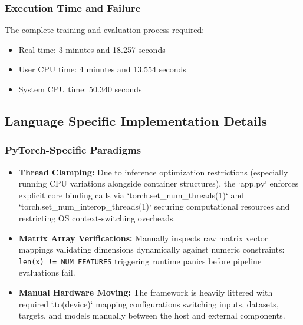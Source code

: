 \documentclass{ieeeaccess}
\begin{document}
\subsubsection{Execution Time and Failure}

The complete training and evaluation process required:

\begin{itemize}
    \item Real time: 3 minutes and 18.257 seconds
    \item User CPU time: 4 minutes and 13.554 seconds
    \item System CPU time: 50.340 seconds
\end{itemize}

\subsection{Language Specific Implementation Details}

\subsubsection{PyTorch-Specific Paradigms}
\begin{itemize}
    \item \textbf{Thread Clamping:} Due to inference optimization restrictions (especially running CPU variations alongside container structures), the `app.py` enforces explicit core binding calls via `torch.set\_num\_threads(1)` and `torch.set\_num\_interop\_threads(1)` securing computational resources and restricting OS context-switching overheads.
    \item \textbf{Matrix Array Verifications:} Manually inspects raw matrix vector mappings validating dimensions dynamically against numeric constraints: \texttt{len(x) != NUM\_FEATURES} triggering runtime panics before pipeline evaluations fail. 
    \item \textbf{Manual Hardware Moving:} The framework is heavily littered with required `.to(device)` mapping configurations switching inputs, datasets, targets, and models manually between the host and external components.
\end{itemize}
\end{document}
